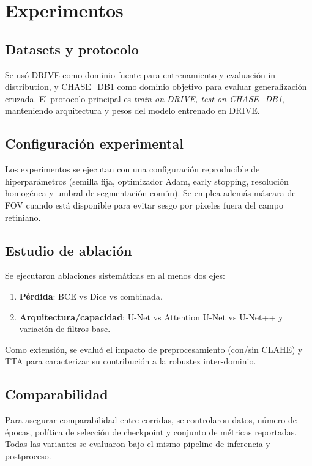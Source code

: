 \section{Experimentos}
\subsection{Datasets y protocolo}
Se usó DRIVE como dominio fuente para entrenamiento y evaluación in-distribution, y CHASE\_DB1 como dominio objetivo para evaluar generalización cruzada. El protocolo principal es \textit{train on DRIVE, test on CHASE\_DB1}, manteniendo arquitectura y pesos del modelo entrenado en DRIVE.

\subsection{Configuración experimental}
Los experimentos se ejecutan con una configuración reproducible de hiperparámetros (semilla fija, optimizador Adam, early stopping, resolución homogénea y umbral de segmentación común). Se emplea además máscara de FOV cuando está disponible para evitar sesgo por píxeles fuera del campo retiniano.

\subsection{Estudio de ablación}
Se ejecutaron ablaciones sistemáticas en al menos dos ejes:
\begin{enumerate}
    \item \textbf{Pérdida}: BCE vs Dice vs combinada.
    \item \textbf{Arquitectura/capacidad}: U-Net vs Attention U-Net vs U-Net++ y variación de filtros base.
\end{enumerate}
Como extensión, se evaluó el impacto de preprocesamiento (con/sin CLAHE) y TTA para caracterizar su contribución a la robustez inter-dominio.

\subsection{Comparabilidad}
Para asegurar comparabilidad entre corridas, se controlaron datos, número de épocas, política de selección de checkpoint y conjunto de métricas reportadas. Todas las variantes se evaluaron bajo el mismo pipeline de inferencia y postproceso.
